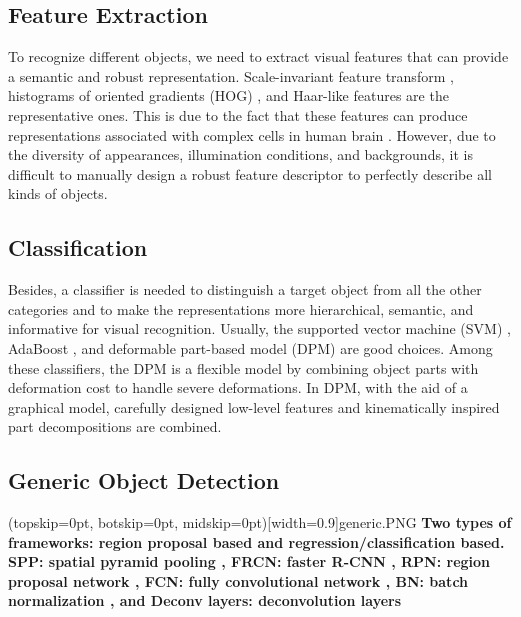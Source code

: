 \documentclass[two column]{ieeeaccess}
\begin{document}
\subsection{Feature Extraction}

To recognize different objects, we need to extract visual features that can provide a semantic and robust representation. Scale-invariant feature transform \cite{19}, histograms of oriented gradients (HOG) \cite{20}, and Haar-like \cite{21} features are the representative ones. This is due to the fact that these features can produce representations associated with complex cells in human brain \cite{19}. However, due to the diversity of appearances, illumination conditions, and backgrounds, it is difficult to manually design a robust feature descriptor to perfectly describe all kinds of objects.

\subsection{Classification}

Besides, a classifier is needed to distinguish a target object from all the other categories and to make the representations more hierarchical, semantic, and informative for visual recognition. Usually, the supported vector machine (SVM) \cite{22}, AdaBoost \cite{23}, and deformable part-based model (DPM) \cite{24} are good choices. Among these classifiers, the DPM is a flexible model by combining object parts with deformation cost to handle severe deformations. In DPM, with the aid of a graphical model, carefully designed low-level features and kinematically inspired part decompositions are combined.

\subsection{Generic Object Detection}

\Figure[ht](topskip=0pt, botskip=0pt, midskip=0pt)[width=0.9\linewidth]{generic.PNG} {\textbf{Two types of frameworks: region proposal based and regression/classification based. SPP: spatial pyramid pooling \cite{64}, FRCN: faster R-CNN \cite{16}, RPN: region proposal network \cite{17}, FCN: fully convolutional network \cite{65}, BN: batch normalization \cite{43}, and Deconv layers: deconvolution layers \cite{54}}\label{fig2}}
\end{document}
